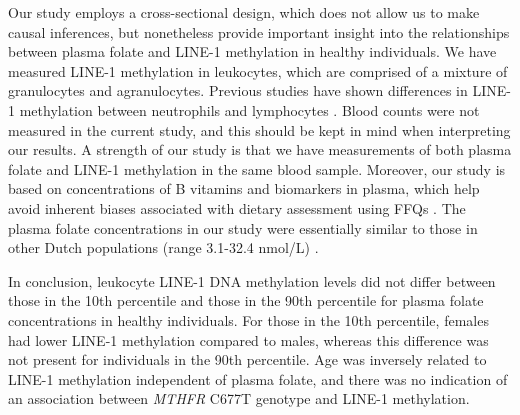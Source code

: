 \noindent Our study employs a cross-sectional design, which does not allow us to make causal inferences, but nonetheless provide important insight into the relationships between plasma folate and LINE-1 methylation in healthy individuals. We have measured LINE-1 methylation in leukocytes, which are comprised of a mixture of granulocytes and agranulocytes. Previous studies have shown differences in LINE-1 methylation between neutrophils and lymphocytes \cite{c310}. Blood counts were not measured in the current study, and this should be kept in mind when interpreting our results. A strength of our study is that we have measurements of both plasma folate and LINE-1 methylation in the same blood sample. Moreover, our study is based on concentrations of B vitamins and biomarkers in plasma, which help avoid inherent biases associated with dietary assessment using FFQs \cite{c320}. The plasma folate concentrations in our study were essentially similar to those in other Dutch populations (range 3.1-32.4 nmol/L) \cite{c319,c336}.

\noindent In conclusion, leukocyte LINE-1 DNA methylation levels did not differ between those in the 10th percentile and those in the 90th percentile for plasma folate concentrations in healthy individuals. For those in the 10th percentile, females had lower LINE-1 methylation compared to males, whereas this difference was not present for individuals in the 90th percentile. Age was inversely related to LINE-1 methylation independent of plasma folate, and there was no indication of an association between \emph{MTHFR} C677T genotype and LINE-1 methylation. 
 
